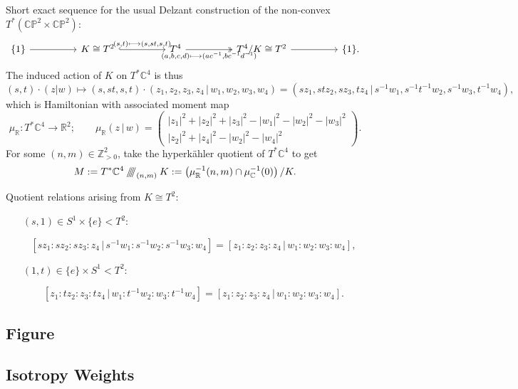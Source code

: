 \documentclass{article}
\newcommand{\lra}{\longrightarrow}
\newcommand{\lbracket}{\left(}
\newcommand{\rbracket}{\right)}
\newcommand{\HK}{hyperk\"ahler }
\newcommand{\PP}{\mathbb{P}}
\newcommand{\RR}{\mathbb{R}}
\newcommand{\CC}{\mathbb{C}}
\newcommand{\ZZ}{\mathbb{Z}}
\newcommand{\sssslash}{\mathbin{/\mkern-6mu/\mkern-6mu/\mkern-6mu/}}
\begin{document}
	Short exact sequence for the usual Delzant construction of the non-convex $T^{\ast}(\CC\PP^{2} \times \CC\PP^{2})$:
	\[
	\begin{tikzcd}
		\{1\} \arrow[rr] &  & K \cong T^{2} \arrow[rr, "{(s,t) \longmapsto (s,st,s,t)}", hook] &  & T^{4} \arrow[rr, "{(a,b,c,d) \longmapsto (ac^{-1}, bc^{-1}d^{-1})}"', two heads] &  & T^{4}/K \cong T^{2} \arrow[rr] &  & \{1\}.
	\end{tikzcd}
	\]
	The induced action of $K$ on $T^{\ast}\CC^{4}$ is thus
	\[
	(s,t) \cdot (z|w) \longmapsto (s,st,s,t) \cdot (z_{1}, z_{2}, z_{3}, z_{4}\, |\, w_{1}, w_{2}, w_{3}, w_{4}) = (s z_{1}, st z_{2}, sz_{3}, tz_{4} \, |\, s^{-1} w_{1}, s^{-1}t^{-1} w_{2}, s^{-1}w_{3}, t^{-1}w_{4}),
	\]
	which is Hamiltonian with associated moment map
	\[
	\mu_{\RR} : T^{\ast}\CC^{4} \lra \RR^{2}; \qquad  \mu_{\RR}(z\, |\, w) = \begin{pmatrix}
		|z_{1}|^{2} + |z_{2}|^{2} + |z_{3}|^{2} - |w_{1}|^{2} - |w_{2}|^{2} - |w_{3}|^{2} \\ |z_{2}|^{2} + |z_{4}|^{2} - |w_{2}|^{2} - |w_{4}|^{2}
	\end{pmatrix}.
	\]
	For some $(n,m) \in \ZZ_{>0}^{2}$, take the \HK quotient of $T^{\ast}\CC^{4}$ to get
	\[
	M := T^{\ast}\CC^{4} \sssslash_{(n,m)} K := \lbracket \mu_{\RR}^{-1}(n,m) \cap \mu_{\CC}^{-1}(0) \rbracket / K.
	\]
	
	Quotient relations arising from $K \cong T^{2}$:
	
	\begin{itemize}
		\item[$(s,1) \in S^{1} \times \{e\} < T^{2}$:]
		
	\[
		[sz_{1} : sz_{2} : sz_{3} : z_{4} \, | \, s^{-1}w_{1} : s^{-1}w_{2} : s^{-1}w_{3} : w_{4}] = [z_{1} : z_{2} : z_{3} : z_{4} \, | \, w_{1} : w_{2} : w_{3} : w_{4} ],
	\]
	
		\item[$(1,t) \in \{e\} \times S^{1} < T^{2}$:]
		
	\[
		[z_{1} : tz_{2} : z_{3} : tz_{4} \, | \, w_{1} : t^{-1}w_{2} : w_{3} : t^{-1}w_{4}] = [z_{1} : z_{2} : z_{3} : z_{4} \, | \, w_{1} : w_{2} : w_{3} : w_{4} ].
	\]
	\end{itemize}
	
	\subsection{Figure}
	
	\subsection{Isotropy Weights}
	
\end{document}
